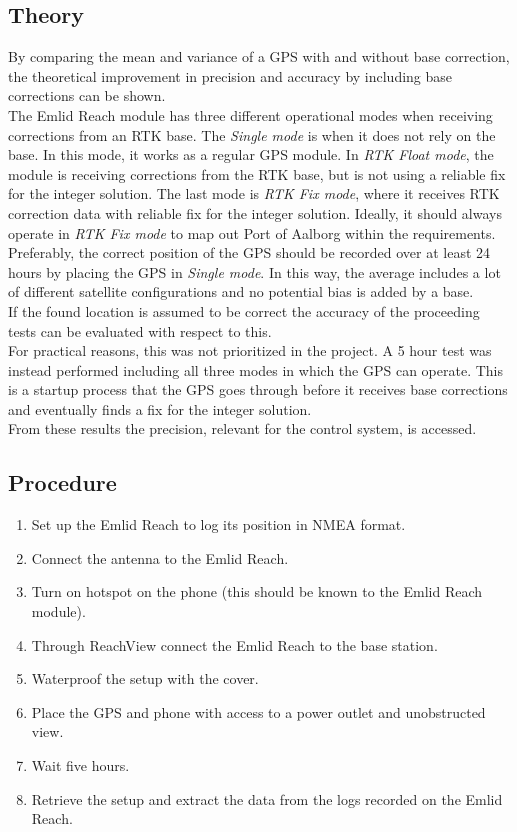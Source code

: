 \subsection*{Theory}
By comparing the mean and variance of a GPS with and without base correction, the theoretical improvement in precision and accuracy by including base corrections can be shown.\\
The Emlid Reach module has three different operational modes when receiving corrections from an RTK base. The \emph{Single mode} is when it does not rely on the base. In this mode, it works as a regular GPS module. In \emph{RTK Float mode}, the module is receiving corrections from the RTK base, but is not using a reliable fix for the integer solution. The last mode is \emph{RTK Fix mode}, where it receives RTK correction data with reliable fix for the integer solution. Ideally, it should always operate in \emph{RTK Fix mode} to map out Port of Aalborg within the requirements.\\
Preferably, the correct position of the GPS should be recorded over at least 24 hours by placing the GPS in \emph{Single mode}. In this way, the average includes a lot of different satellite configurations and no potential bias is added by a base.\\
If the found location is assumed to be correct the accuracy of the proceeding tests can be evaluated with respect to this.\\
For practical reasons, this was not prioritized in the project. A 5 hour test was instead performed including all three modes in which the GPS can operate. This is a startup process that the GPS goes through before it receives base corrections and eventually finds a fix for the integer solution.\\
From these results the precision, relevant for the control system, is accessed.

\subsection*{Procedure}
\begin{enumerate}
    \item Set up the Emlid Reach to log its position in NMEA format.
    \item Connect the antenna to the Emlid Reach.
	\item Turn on hotspot on the phone (this should be known to the Emlid Reach module).
	\item Through ReachView connect the Emlid Reach to the base station.
	\item Waterproof the setup with the cover.
	\item Place the GPS and phone with access to a power outlet and unobstructed view.
	\item Wait five hours.
	\item Retrieve the setup and extract the data from the logs recorded on the Emlid Reach.
\end{enumerate}

